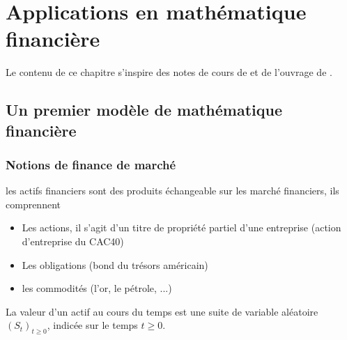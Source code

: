 \chapter{Applications en mathématique financière}\label{chap:math_fi}
Le contenu de ce chapitre s'inspire des notes de cours de \citet{Tankov2010} et de l'ouvrage de \citet{Mikosch1998}.
\section{Un premier modèle de mathématique financière}
\subsection{Notions de finance de marché}\label{sec:financial_market}
les actifs financiers sont des produits échangeable sur les marché financiers, ils comprennent 
\begin{itemize}
    \item Les actions, il s'agit d'un titre de propriété partiel d'une entreprise (action d'entreprise du CAC40)
    \item Les obligations (bond du trésors américain) 
    \item les commodités (l'or, le pétrole, ...)
\end{itemize}
La valeur d'un actif au cours du temps est une suite de variable aléatoire $(S_t)_{t \geq 0}$, indicée sur le temps $t\geq0$.\\ 

